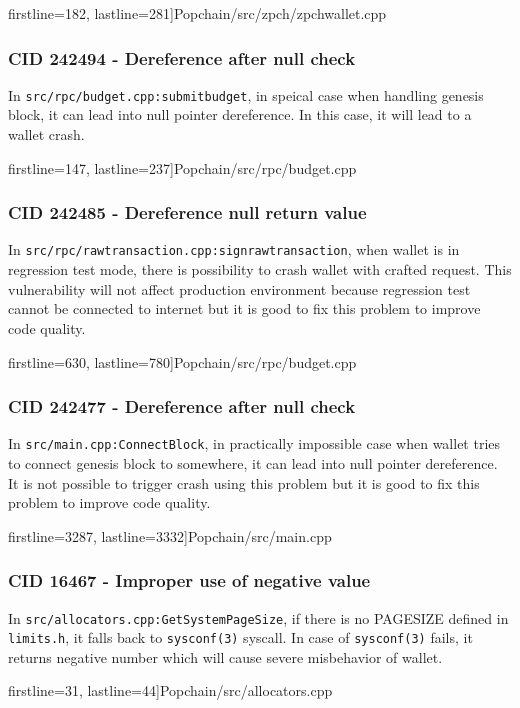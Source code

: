 \documentclass {article}
\begin{document}
 firstline=182, lastline=281]{Popchain/src/zpch/zpchwallet.cpp}

\subsubsection{CID 242494 - Dereference after null check}
In \texttt{src/rpc/budget.cpp:submitbudget}, in speical case when handling
genesis block, it can lead into null pointer dereference. In this case, it will
lead to a wallet crash.

 firstline=147, lastline=237]{Popchain/src/rpc/budget.cpp}

\subsubsection{CID 242485 - Dereference null return value}
In \texttt{src/rpc/rawtransaction.cpp:signrawtransaction}, when wallet is in
regression test mode, there is possibility to crash wallet with crafted request.
This vulnerability will not affect production environment because regression
test cannot be connected to internet but it is good to fix this problem to
improve code quality.

 firstline=630, lastline=780]{Popchain/src/rpc/budget.cpp}

\subsubsection{CID 242477 - Dereference after null check}
In \texttt{src/main.cpp:ConnectBlock}, in practically impossible case when
wallet tries to connect genesis block to somewhere, it can lead into null
pointer dereference. It is not possible to trigger crash using this problem but
it is good to fix this problem to improve code quality.

 firstline=3287, lastline=3332]{Popchain/src/main.cpp}

\subsubsection{CID 16467 - Improper use of negative value}
In \texttt{src/allocators.cpp:GetSystemPageSize}, if there is no PAGESIZE
defined in \texttt{limits.h}, it falls back to \texttt{sysconf(3)} syscall. In case of
\texttt{sysconf(3)} fails, it returns negative number which will cause severe
misbehavior of wallet.

 firstline=31, lastline=44]{Popchain/src/allocators.cpp}
\end{document}
